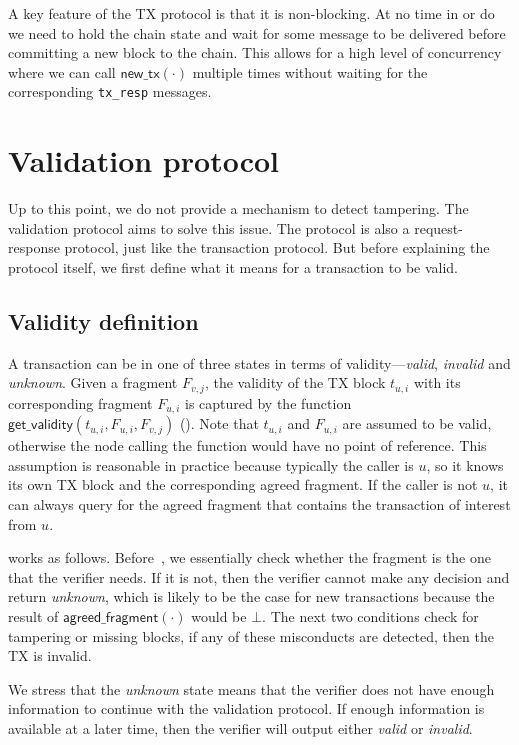 A key feature of the TX protocol is that it is non-blocking.
At no time in  or  do we need to hold the chain state and wait for some message to be delivered before committing a new block to the chain.
This allows for a high level of concurrency where we can call $\textsf{new\_tx}(\cdot)$ multiple times without waiting for the corresponding \texttt{tx\_resp} messages.

\section{Validation protocol}
\label{sec:vd-protocol}

Up to this point, we do not provide a mechanism to detect tampering.
The validation protocol aims to solve this issue.
The protocol is also a request-response protocol, just like the transaction protocol.
But before explaining the protocol itself, we first define what it means for a transaction to be valid.

\subsection{Validity definition}
A transaction can be in one of three states in terms of validity---\emph{valid}, \emph{invalid} and \emph{unknown}.
Given a fragment $F_{v, j}$, the validity of the TX block $t_{u, i}$ with its corresponding fragment $F_{u, i}$ is captured by the function $\textsf{get\_validity}(t_{u, i}, F_{u, i}, F_{v, j})$ ().
Note that $t_{u, i}$ and $F_{u, i}$ are assumed to be valid,
otherwise the node calling the function would have no point of reference.
This assumption is reasonable in practice because typically the caller is $u$,
so it knows its own TX block and the corresponding agreed fragment.
If the caller is not $u$, it can always query for the agreed fragment that contains the transaction of interest from $u$.

 works as follows.
Before~,
we essentially check whether the fragment is the one that the verifier needs.
If it is not, then the verifier cannot make any decision and return \emph{unknown},
which is likely to be the case for new transactions because the result of $\textsf{agreed\_fragment}(\cdot)$ would be $\bot$.
The next two conditions check for tampering or missing blocks, if any of these misconducts are detected, then the TX is invalid.

We stress that the \emph{unknown} state means that the verifier does not have enough information to continue with the validation protocol.
If enough information is available at a later time, then the verifier will output either \emph{valid} or \emph{invalid}.

